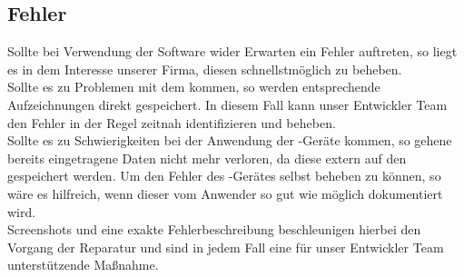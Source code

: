 \subsection{Fehler}

\noindent
Sollte bei Verwendung der \bb Software wider Erwarten ein Fehler auftreten, so liegt es in dem Interesse unserer Firma, diesen schnellstmöglich zu beheben.\\[.1cm]

\noindent
Sollte es zu Problemen mit dem \bb \ser kommen, so werden entsprechende Aufzeichnungen direkt gespeichert. In diesem Fall kann unser Entwickler Team den Fehler in der Regel zeitnah identifizieren und beheben.\\[.1cm]

\noindent
Sollte es zu Schwierigkeiten bei der Anwendung der \cli-Geräte kommen, so gehene bereits eingetragene Daten nicht mehr verloren, da diese extern auf den \bb \ser gespeichert werden. Um den Fehler des \cli-Gerätes selbst beheben zu können, so wäre es hilfreich, wenn dieser vom Anwender so gut wie möglich dokumentiert wird.\\[.1cm]
Screenshots und eine exakte Fehlerbeschreibung beschleunigen hierbei den Vorgang der Reparatur und sind in jedem Fall eine für unser Entwickler Team unterstützende Maßnahme. 
